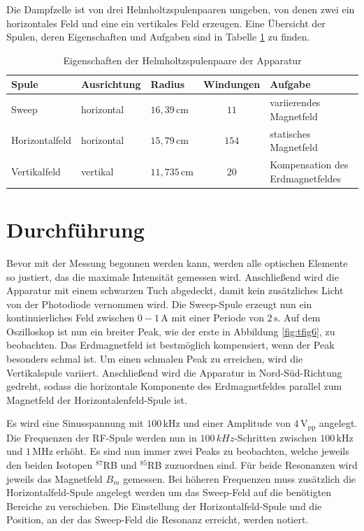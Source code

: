 Die Dampfzelle ist von drei Helmholtzspulenpaaren umgeben, von denen zwei ein horizontales Feld und eine ein vertikales Feld erzeugen.
Eine Übersicht der Spulen, deren Eigenschaften und Aufgaben sind in Tabelle \ref{tab:ttab1} zu finden.
\FloatBarrier
\begin{table}[h]
    \centering
    \caption{Eigenschaften der Helmholtzspulenpaare der Apparatur}
    \label{tab:ttab1}
    \begin{tabular}{l l l c l}
        \toprule
        {Spule} & {Ausrichtung} & {Radius} & {Windungen} & {Aufgabe} \\
        \midrule
        Sweep & horizontal & $16,39\,\si{\cm}$ & $11$ & variierendes Magnetfeld\\
        Horizontalfeld & horizontal & $15,79\,\si{\cm}$ & $154$ & statisches Magnetfeld\\
        Vertikalfeld & vertikal & $11,735\,\si{\cm}$ & $20$ & Kompensation des Erdmagnetfeldes\\
        \bottomrule
    \end{tabular}
\end{table}
\FloatBarrier
\noindent


\section{Durchführung}
Bevor mit der Messung begonnen werden kann, werden alle optischen Elemente so justiert, das die maximale Intensität gemessen wird.
Anschließend wird die Apparatur mit einem schwarzen Tuch abgedeckt, damit kein zusätzliches Licht von der Photodiode vernommen wird.
Die Sweep-Spule erzeugt nun ein kontinuierliches Feld zwischen $0-1\,\si{\A}$ mit einer Periode von $2\,\si{\s}$.
Auf dem Oszilloskop ist nun ein breiter Peak, wie der erste in Abbildung \ref{fig:tfig6}, zu beobachten.
Das Erdmagnetfeld ist bestmöglich kompensiert, wenn der Peak besonders schmal ist.
Um einen schmalen Peak zu erreichen, wird die Vertikalspule variiert.
Anschließend wird die Apparatur in Nord-Süd-Richtung gedreht, sodass die horizontale Komponente des Erdmagnetfeldes parallel zum Magnetfeld der Horizontalenfeld-Spule ist.

Es wird eine Sinusspannung mit $100\,\si{\kHz}$ und einer Amplitude von $4\,\text{V}_{\text{pp}}$ angelegt.
Die Frequenzen der RF-Spule werden nun in $100\,\si{kHz}$-Schritten zwischen $100\,\si{\kHz}$ und $1\,\si{\MHz}$ erhöht.
Es sind nun immer zwei Peaks zu beobachten, welche jeweils den beiden Isotopen $^{87}$RB und $^{85}$RB zuzuordnen sind.
Für beide Resonanzen wird jeweils das Magnetfeld $B_m$ gemessen.
Bei höheren Frequenzen muss zusätzlich die Horizontalfeld-Spule angelegt werden um das Sweep-Feld auf die benötigten Bereiche zu verschieben.
Die Einstellung der Horizontalfeld-Spule und die Position, an der das Sweep-Feld die Resonanz erreicht, werden notiert.

